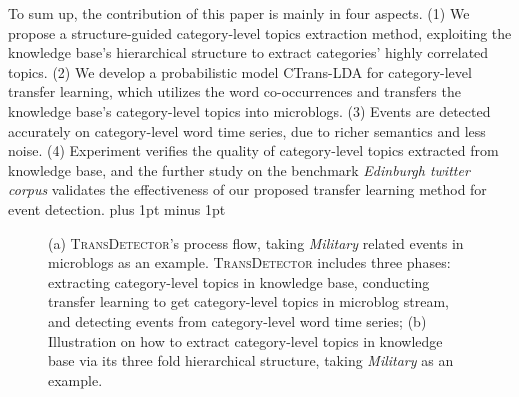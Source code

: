 \documentclass[runningheads,a4paper]{llncs}
\theoremstyle{exampstyle}
\begin{document}
To sum up, the contribution of this paper is mainly in four aspects.
(1) We propose a structure-guided category-level topics extraction method, exploiting the knowledge base's hierarchical structure to extract categories' highly correlated topics. 
(2) We develop a probabilistic model CTrans-LDA for category-level transfer learning, which utilizes the word co-occurrences and transfers the knowledge base's category-level topics into microblogs. 
(3) Events are detected accurately on category-level word time series, due to richer semantics and less noise. 
(4) Experiment verifies the quality of category-level topics extracted from knowledge base, and the further study on the benchmark \textit{Edinburgh twitter corpus} validates the effectiveness of our proposed transfer learning method for event detection.
\intextsep=1pt plus 1pt minus 1pt
\begin{figure}[h]
	\setlength{\abovecaptionskip}{0.cm}
	\setlength{\belowcaptionskip}{0.cm}
	\centering
    \label{fig:subfig} %
        \caption{(a) \textsc{TransDetector}'s process flow, taking \textit{Military} related events in microblogs as an example. \textsc{TransDetector} includes three phases: extracting category-level topics in knowledge base, conducting transfer learning to get category-level topics in microblog stream, and detecting events from category-level word time series; (b) Illustration on how to extract category-level topics in knowledge base via its three fold hierarchical structure, taking \textit{Military} as an example.}
\end{figure}
\end{document}
